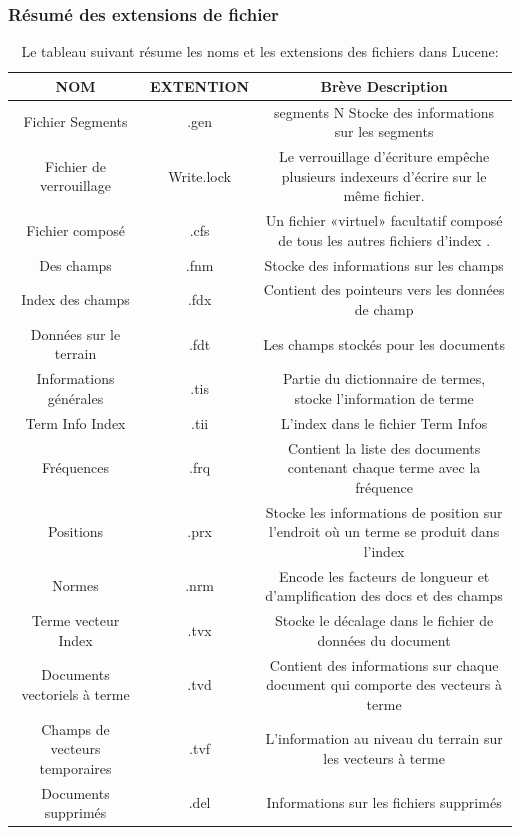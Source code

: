 \documentclass[12pt]{report}
\begin{document}
\subsubsection{Résumé des extensions de fichier}
\newpage
\begin{flushleft}
\begin{table}
\caption{Le tableau suivant résume les noms et les extensions des fichiers dans Lucene:}
\begin{tabular}{|c|c|c|}
\hline
NOM & EXTENTION & Brève Description\\
\hline\hline
Fichier Segments & .gen &segments N Stocke des informations sur les segments\\
Fichier de verrouillage	& Write.lock	& Le verrouillage d'écriture empêche plusieurs indexeurs d'écrire sur le même fichier.\\
Fichier composé	& .cfs	&  Un fichier «virtuel» facultatif composé de tous les autres fichiers d'index .\\
Des champs	& .fnm	& Stocke des informations sur les champs\\
Index des champs	& .fdx	& Contient des pointeurs vers les données de champ\\
Données sur le terrain	 &.fdt	& Les champs stockés pour les documents\\
Informations générales	& .tis &	 Partie du dictionnaire de termes, stocke l'information de terme\\
Term Info Index	& .tii &	 L'index dans le fichier Term Infos\\
Fréquences	& .frq	& Contient la liste des documents contenant chaque terme avec la fréquence\\
Positions	& .prx	& Stocke les informations de position sur l'endroit où un terme se produit dans l'index\\
Normes	& .nrm	& Encode les facteurs de longueur et d'amplification des docs et des champs\\
Terme vecteur Index	 & .tvx	& Stocke le décalage dans le fichier de données du document\\
Documents vectoriels à terme	& .tvd	& Contient des informations sur chaque document qui comporte des vecteurs à terme\\
Champs de vecteurs temporaires	&  .tvf	& L'information au niveau du terrain sur les vecteurs à terme\\
Documents supprimés	 & .del	& Informations sur les fichiers supprimés\\
\hline\end{tabular}
\label{table:precision}
\end{table}
\end{flushleft}
\end{document}

